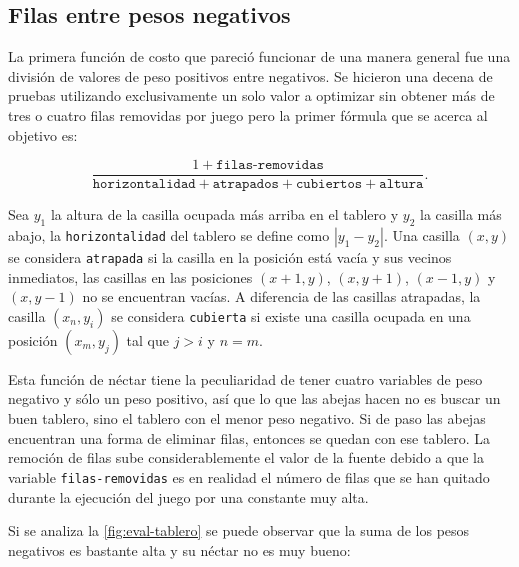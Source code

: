 



\subsection{Filas entre pesos negativos}

La primera función de costo que pareció funcionar de una manera general
fue una división de valores de peso positivos entre negativos. Se hicieron una 
decena de pruebas utilizando exclusivamente un solo valor a optimizar 
sin obtener más de tres o cuatro filas removidas por juego pero la primer 
fórmula que se acerca al objetivo es:

\begin{displaymath}
    \frac{1 + \texttt{filas-removidas}}{\texttt{horizontalidad} + \texttt{atrapados} + \texttt{cubiertos} + \texttt{altura}} .
\end{displaymath}

Sea $y_{1}$ la altura de la casilla ocupada más arriba en el tablero y $y_{2}$ la casilla 
más abajo, la \texttt{horizontalidad} del tablero se define como $|y_{1} - y_{2}|$. 
Una casilla $(x,y)$ se considera \texttt{atrapada} si la casilla en la posición está vacía 
y sus vecinos inmediatos, las casillas en las posiciones $(x + 1, y)$, 
$(x, y + 1)$, $(x - 1, y)$ y $(x, y - 1)$ no se encuentran vacías. A diferencia de 
las casillas atrapadas, la casilla $(x_{n}, y_{i})$ se considera \texttt{cubierta} 
si existe una casilla ocupada en una posición $(x_{m},y_{j})$ tal que $j > i$ y $n = m$.

Esta función de néctar tiene la peculiaridad de tener cuatro variables de peso negativo 
y sólo un peso positivo, así que lo que las abejas hacen no es buscar un buen 
tablero, sino el tablero con el menor peso negativo. Si de paso las abejas 
encuentran una forma de eliminar filas, entonces se quedan con ese tablero. 
La remoción de filas sube considerablemente el valor de la fuente debido a 
que la variable \texttt{filas-removidas} es en realidad el número de filas que se 
han quitado durante la ejecución del juego por una constante muy alta.




Si se analiza la \cref{fig:eval-tablero} se puede observar que la suma de los pesos negativos 
es bastante alta y su néctar no es muy bueno: 

